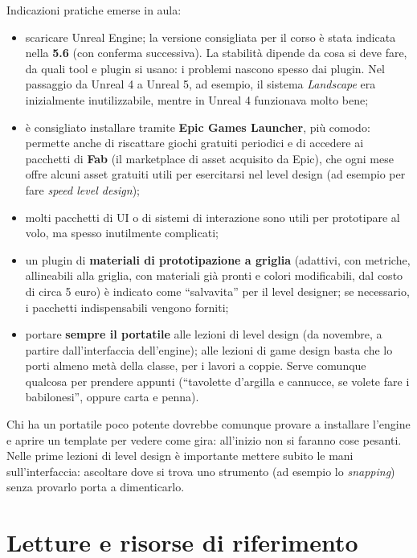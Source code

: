 Indicazioni pratiche emerse in aula:
\begin{itemize}
  \item scaricare Unreal Engine; la versione consigliata per il corso è
        stata indicata nella \textbf{5.6} (con conferma successiva). La
        stabilità dipende da cosa si deve fare, da quali tool e plugin si
        usano: i problemi nascono spesso dai plugin. Nel passaggio da Unreal 4
        a Unreal 5, ad esempio, il sistema \emph{Landscape} era inizialmente
        inutilizzabile, mentre in Unreal 4 funzionava molto bene;
  \item è consigliato installare tramite \textbf{Epic Games Launcher}, più
        comodo: permette anche di riscattare giochi gratuiti periodici e di
        accedere ai pacchetti di \textbf{Fab} (il marketplace di asset
        acquisito da Epic), che ogni mese offre alcuni asset gratuiti utili
        per esercitarsi nel level design (ad esempio per fare \emph{speed
        level design});
  \item molti pacchetti di UI o di sistemi di interazione sono utili per
        prototipare al volo, ma spesso inutilmente complicati;
  \item un plugin di \textbf{materiali di prototipazione a griglia} (adattivi,
        con metriche, allineabili alla griglia, con materiali già pronti e
        colori modificabili, dal costo di circa 5 euro) è indicato come
        ``salvavita'' per il level designer; se necessario, i pacchetti
        indispensabili vengono forniti;
  \item portare \textbf{sempre il portatile} alle lezioni di level design
        (da novembre, a partire dall'interfaccia dell'engine); alle lezioni
        di game design basta che lo porti almeno metà della classe, per i
        lavori a coppie. Serve comunque qualcosa per prendere appunti
        (``tavolette d'argilla e cannucce, se volete fare i babilonesi'',
        oppure carta e penna).
\end{itemize}
Chi ha un portatile poco potente dovrebbe comunque provare a installare
l'engine e aprire un template per vedere come gira: all'inizio non si faranno
cose pesanti. Nelle prime lezioni di level design è importante mettere subito
le mani sull'interfaccia: ascoltare dove si trova uno strumento (ad esempio lo
\emph{snapping}) senza provarlo porta a dimenticarlo.

\section{Letture e risorse di riferimento}
\label{sec:risorse}

